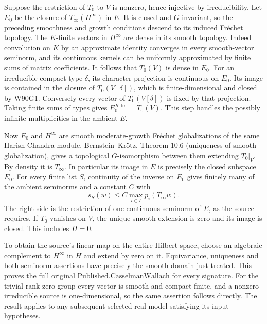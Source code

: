 Suppose the restriction of $T_0$ to $V$ is nonzero, hence injective
by irreducibility. Let $E_0$ be the closure of $T_\infty(H^\infty)$
in $E$. It is closed and $G$-invariant, so the preceding smoothness
and growth conditions descend to its induced Fr\'echet topology.
The $K$-finite vectors in $H^\infty$ are dense in its smooth
topology. Indeed convolution on $K$ by an approximate identity
converges in every smooth-vector seminorm, and its continuous kernels
can be uniformly approximated by finite sums of matrix coefficients.
It follows that $T_0(V)$ is dense in $E_0$. For an irreducible
compact type $\delta$, its character projection is continuous on
$E_0$. Its image is contained in the closure of $T_0(V[\delta])$,
which is finite-dimensional and closed by W90G1. Conversely every
vector of $T_0(V[\delta])$ is fixed by that projection. Taking finite
sums of types gives $E_0^{K\text{-fin}}=T_0(V)$. This step
handles the possibly infinite multiplicities in the ambient $E$.

Now $E_0$ and $H^\infty$ are smooth moderate-growth Fr\'echet
globalizations of the same Harish-Chandra module.
Bernstein--Kr\"otz, Theorem 10.6 (uniqueness of smooth
globalization), gives a topological $G$-isomorphism between them
extending $T_0|_V$. By density it is $T_\infty$. In particular
its image in $E$ is precisely the closed subspace $E_0$. For every
finite list $S$, continuity of the inverse on $E_0$ gives finitely
many of the ambient seminorms and a constant $C$ with
\[
       s_S(w)\le C\max_{i\in I}p_i(T_\infty w).
\]
The right side is the restriction of one continuous seminorm of $E$,
as the source requires. If $T_0$ vanishes on $V$, the unique smooth
extension is zero and its image is closed. This includes $H=0$.

To obtain the source's linear map on the entire Hilbert space,
choose an algebraic complement to $H^\infty$ in $H$ and extend
by zero on it. Equivariance, uniqueness and both seminorm assertions
have precisely the smooth domain just treated. This proves the full
original $\mathrm{Published.CasselmanWallach}$ for every signature.
For the trivial rank-zero group every vector is smooth and compact
finite, and a nonzero irreducible source is one-dimensional, so the
same assertion follows directly. The result applies to any
subsequent selected real model satisfying its input hypotheses.

